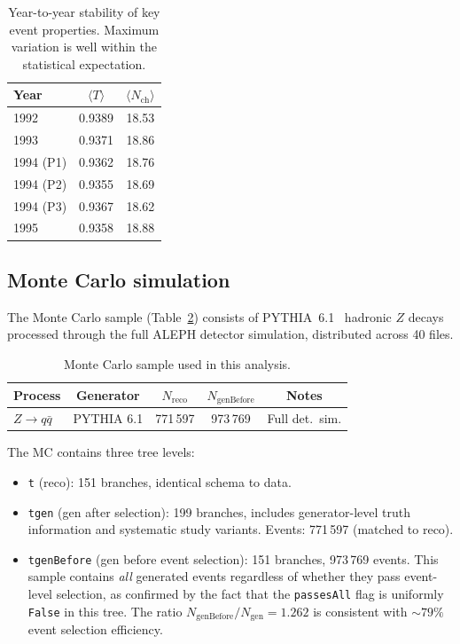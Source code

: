 \documentclass[11pt,a4paper]{article}
\begin{document}
\begin{table}[htbp]
\centering
\caption{Year-to-year stability of key event properties.  Maximum
  variation is well within the statistical expectation.}
\label{tbl:year-stability}
\begin{tabular}{lcc}
\toprule
Year & $\langle T \rangle$ & $\langle N_\text{ch} \rangle$ \\
\midrule
1992 & 0.9389 & 18.53 \\
1993 & 0.9371 & 18.86 \\
1994 (P1) & 0.9362 & 18.76 \\
1994 (P2) & 0.9355 & 18.69 \\
1994 (P3) & 0.9367 & 18.62 \\
1995 & 0.9358 & 18.88 \\
\bottomrule
\end{tabular}
\end{table}

\subsection{Monte Carlo simulation}
\label{sec:data-mc}

The Monte Carlo sample (Table~\ref{tbl:mc}) consists of
PYTHIA~6.1~\cite{Sjostrand:2000wi} hadronic $Z$ decays processed
through the full ALEPH detector simulation, distributed across
40 files.

\begin{table}[htbp]
\centering
\caption{Monte Carlo sample used in this analysis.}
\label{tbl:mc}
\begin{tabular}{lcccc}
\toprule
Process & Generator & $N_\text{reco}$ & $N_\text{genBefore}$
  & Notes \\
\midrule
$Z \to q\bar{q}$ & PYTHIA 6.1 & 771\,597 & 973\,769
  & Full det.\ sim. \\
\bottomrule
\end{tabular}
\end{table}

The MC contains three tree levels:
\begin{itemize}
\item \texttt{t} (reco): 151 branches, identical schema to data.
\item \texttt{tgen} (gen after selection): 199 branches, includes
  generator-level truth information and systematic study variants.
  Events: 771\,597 (matched to reco).
\item \texttt{tgenBefore} (gen before event selection): 151 branches,
  973\,769 events.  This sample contains \emph{all} generated events
  regardless of whether they pass event-level selection, as confirmed by
  the fact that the \texttt{passesAll} flag is uniformly \texttt{False}
  in this tree.  The ratio $N_\text{genBefore}/N_\text{gen} = 1.262$
  is consistent with $\sim\!79\%$ event selection efficiency.
\end{itemize}
\end{document}

